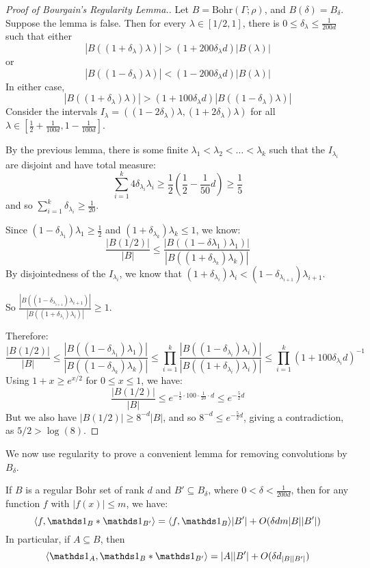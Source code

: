\documentclass[10pt,a4paper]{article}
\begin{document}
\begin{proof}[Proof of Bourgain's Regularity Lemma.]
  Let $B = \text{Bohr}(\Gamma;\rho)$, and $B(\delta) = B_\delta$. Suppose the lemma is false. Then for every $\lambda \in [1/2, 1]$, there is $0 \leq \delta_\lambda \leq \frac{1}{200d}$ such that either
  \[|B((1+\delta_\lambda)\lambda)| > (1+200\delta_\lambda d)|B(\lambda)|\]
  or
  \[|B((1-\delta_\lambda)\lambda)| < (1-200\delta_\lambda d)|B(\lambda)|\]
  In either case,
  \[|B((1+\delta_\lambda)\lambda)| > (1+100\delta_\lambda d)|B((1-\delta_\lambda)\lambda)|\]
  Consider the intervals $I_{\lambda} = ((1-2\delta_\lambda)\lambda, (1+2\delta_\lambda)\lambda)$ for all $\lambda \in [\frac12 +\frac{1}{100d}, 1-\frac{1}{100d}]$.

  By the previous lemma, there is some finite $\lambda_1 < \lambda_2 < \ldots <\lambda_k$ such that the $I_{\lambda_i}$ are disjoint and have total measure:
  \[\sum_{i=1}^k 4\delta_{\lambda_i}\lambda_i \geq \frac{1}{2}(\frac{1}{2}-\frac{1}{50}d) \geq \frac15\]
  and so $\sum_{i=1}^k \delta_{\lambda_i} \geq \frac{1}{20}$.

  Since $(1-\delta_{\lambda_1})\lambda_1 \geq \frac12$ and $(1+\delta_{\lambda_k})\lambda_k \leq 1$, we know:
  \[\frac{|B(1/2)|}{|B|} \leq \frac{|B((1-\delta\lambda_1)\lambda_1)|}{|B((1+\delta_{\lambda_k})\lambda_k)|}\]
  By disjointedness of the $I_{\lambda_i}$, we know that $(1+\delta_{\lambda_i})\lambda_i < (1-\delta_{\lambda_{i+1}})\lambda_{i+1}$.

  So $\frac{|B((1-\delta_{\lambda_{i+1}})\lambda_{i+1})|}{|B((1+\delta_{\lambda_i})\lambda_i)|} \geq 1$.

  Therefore:
  \[\frac{|B(1/2)|}{|B|} \leq \frac{|B((1-\delta_{\lambda_1})\lambda_1)|}{|B((1-\delta_{\lambda_k})\lambda_k)|} \leq \prod_{i=1}^k \frac{|B((1-\delta_{\lambda_i})\lambda_i)|}{|B((1+\delta_{\lambda_i})\lambda_i)|} \leq \prod_{i=1}^k (1+100\delta_{\lambda_i}d)^{-1}\]
  Using $1+x \geq e^{x/2}$ for $0 \leq x \leq 1$, we have:
  \[\frac{|B(1/2)|}{|B|} \leq e^{-\frac12\cdot 100 \cdot \frac{1}{20}\cdot d} \leq e^{-\frac{5}{2}d}\]
  But we also have $|B(1/2)| \geq 8^{-d}|B|$, and so $8^{-d} \leq e^{-\frac52 d}$, giving a contradiction, as $5/2 > \log(8)$.
\end{proof}
We now use regularity to prove a convenient lemma for removing convolutions by $B_\delta$.
\begin{lemma}
  If $B$ is a regular Bohr set of rank $d$ and $B' \subseteq B_\delta$, where $0 < \delta < \frac{1}{200d}$, then for any function $f$ with $|f(x)| \leq m$, we have:
  \[\angle{f, \one_B \ast \one_{B'}} = \angle{f, \one_B}|B'| + O(\delta d m |B||B'|)\]
  In particular, if $A \subseteq B$, then
  \[\angle{\one_A, \one_B \ast \one_{B'}} = |A||B'| + O(\delta d_{|B||B'|})\]
\end{lemma}
\end{document}
